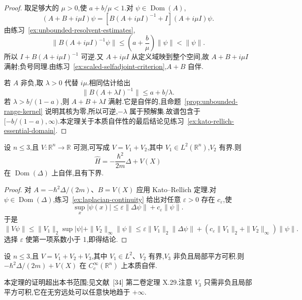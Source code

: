 \begin{proof}
取足够大的 \(\mu>0\),使 \(a+b/\mu<1\).对 \(\psi\in\operatorname{Dom}(A)\),
\[
(A+B+i\mu I)\psi
=\left[B(A+i\mu I)^{-1}+I\right](A+i\mu I)\psi.
\]
由练习~\ref{ex:unbounded-resolvent-estimates},
\[
\|B(A+i\mu I)^{-1}\psi\|
\leq\left(a+\frac{b}{\mu}\right)\|\psi\|<\|\psi\|.
\]
所以 \(I+B(A+i\mu I)^{-1}\) 可逆.又 \(A+i\mu I\) 从定义域映到整个空间,故 \(A+B+i\mu I\) 满射;负号同理.由练习~\ref{ex:scaled-selfadjoint-criterion},\(A+B\) 自伴.

若 \(A\) 非负,取 \(\lambda>0\) 代替 \(i\mu\).相同估计给出
\[
\|B(A+\lambda I)^{-1}\|\leq a+b/\lambda.
\]
若 \(\lambda>b/(1-a)\),则 \(A+B+\lambda I\) 满射.它是自伴的,且命题~\ref{prop:unbounded-range-kernel} 说明其核为零,所以可逆,\(-\lambda\) 属于预解集.故谱包含于 \([-b/(1-a),\infty)\).本定理关于本质自伴性的最后结论见练习~\ref{ex:kato-rellich-essential-domain}.
\end{proof}

\begin{theorem}\label{thm:schrodinger-selfadjoint-L2-potential}
设 \(n\leq3\),且 \(V:\mathbb{R}^{n}\to\mathbb{R}\) 可测,可写成 \(V=V_{1}+V_{2}\),其中 \(V_{1}\in L^{2}(\mathbb{R}^{n})\),\(V_{2}\) 有界.则
\[
\widehat H=-\frac{\hbar^{2}}{2m}\Delta+V(X)
\]
在 \(\operatorname{Dom}(\Delta)\) 上自伴,且有下界.
\end{theorem}

\begin{proof}
对 \(A=-\hbar^{2}\Delta/(2m)\)、\(B=V(X)\) 应用 Kato--Rellich 定理.对 \(\psi\in\operatorname{Dom}(\Delta)\),练习~\ref{ex:laplacian-continuity} 给出对任意 \(\varepsilon>0\) 存在 \(c_{\varepsilon}\),使
\[
\sup_{x}|\psi(x)|\leq\varepsilon\|\Delta\psi\|+c_{\varepsilon}\|\psi\|.
\]
于是
\[
\|V\psi\|
\leq\|V_{1}\|_{2}\sup|\psi|+\|V_{2}\|_{\infty}\|\psi\|
\leq\varepsilon\|V_{1}\|_{2}\|\Delta\psi\|
+(c_{\varepsilon}\|V_{1}\|_{2}+\|V_{2}\|_{\infty})\|\psi\|.
\]
选择 \(\varepsilon\) 使第一项系数小于 1,即得结论.
\end{proof}

\begin{theorem}\label{thm:schrodinger-essential-selfadjoint}
设 \(n\leq3\),且 \(V=V_{1}+V_{2}+V_{3}\),其中 \(V_{1}\in L^{2}\)、\(V_{2}\) 有界,\(V_{3}\) 非负且局部平方可积.则 \(-\hbar^{2}\Delta/(2m)+V(X)\) 在 \(C_{c}^{\infty}(\mathbb{R}^{n})\) 上本质自伴.
\end{theorem}

本定理的证明超出本书范围;见文献~[34] 第二卷定理 X.29.注意 \(V_{3}\) 只需非负且局部平方可积,它在无穷远处可以任意快地趋于 \(+\infty\).

